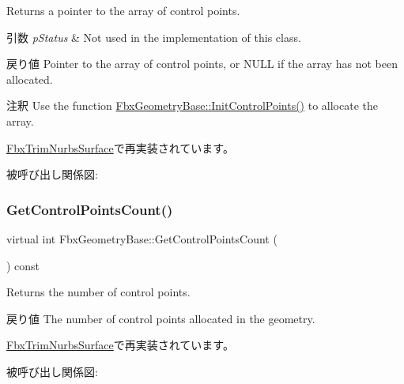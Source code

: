 Returns a pointer to the array of control points. 
\begin{DoxyParams}{引数}
{\em p\+Status} & Not used in the implementation of this class. \\
\hline
\end{DoxyParams}
\begin{DoxyReturn}{戻り値}
Pointer to the array of control points, or {\ttfamily N\+U\+LL} if the array has not been allocated. 
\end{DoxyReturn}
\begin{DoxyRemark}{注釈}
Use the function \hyperlink{class_fbx_geometry_base_a471b736f2595c006a338c07a61907127}{Fbx\+Geometry\+Base\+::\+Init\+Control\+Points()} to allocate the array. 
\end{DoxyRemark}


\hyperlink{class_fbx_trim_nurbs_surface_aff21dc007688399ca91da1a9c9f6e584}{Fbx\+Trim\+Nurbs\+Surface}で再実装されています。

被呼び出し関係図\+:
\mbox{\label{class_fbx_geometry_base_aa9f42ae6a958036722670143fabf3b17}} 
\subsubsection{\texorpdfstring{Get\+Control\+Points\+Count()}{GetControlPointsCount()}}
{\footnotesize\ttfamily virtual int Fbx\+Geometry\+Base\+::\+Get\+Control\+Points\+Count (\begin{DoxyParamCaption}{ }\end{DoxyParamCaption}) const\hspace{0.3cm}{\ttfamily [virtual]}}

Returns the number of control points. \begin{DoxyReturn}{戻り値}
The number of control points allocated in the geometry. 
\end{DoxyReturn}


\hyperlink{class_fbx_trim_nurbs_surface_a11c7260f31786dd8ace17769d0ccb302}{Fbx\+Trim\+Nurbs\+Surface}で再実装されています。

被呼び出し関係図\+:
\mbox{\label{class_fbx_geometry_base_a810b4a313e01bbaa41fe25ac753a8996}} 
